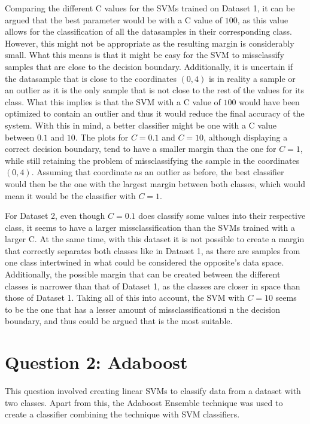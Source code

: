 \documentclass{article}
\begin{document}
Comparing the different C values for the SVMs trained on Dataset 1, it can be argued that the best parameter would be with a C value of $100$, as this value allows for the classification of all the datasamples in their corresponding class. However, this might not be appropriate as the resulting margin is considerably small. What this means is that it might be easy for the SVM to missclassify samples that are close to the decision boundary. Additionally, it is uncertain if the datasample that is close to the coordinates $(0,4)$ is in reality a sample or an outlier as it is the only sample that is not close to the rest of the values for its class. What this implies is that the SVM with a C value of $100$ would have been optimized to contain an outlier and thus it would reduce the final accuracy of the system. With this in mind, a better classifier might be one with a C value between $0.1$ and $10$. The plots for $C=0.1$ and $C=10$, although displaying a correct decision boundary, tend to have a smaller margin than the one for $C=1$, while still retaining the problem of missclassifying the sample in the coordinates $(0,4)$. Assuming that coordinate as an outlier as before, the best classifier would then be the one with the largest margin between both classes, which would mean it would be the classifier with $C=1$.

For Dataset 2, even though $C=0.1$ does classify some values into their respective class, it seems to have a larger missclassification than the SVMs trained with a larger C. At the same time, with this dataset it is not possible to create a margin that correctly separates both classes like in Dataset 1, as there are samples from one class intertwined in what could be considered the opposite's data space. Additionally, the possible margin that can be created between the different classes is narrower than that of Dataset 1, as the classes are closer in space than those of Dataset 1. Taking all of this into account, the SVM with $C=10$ seems to be the one that has a lesser amount of missclassificationsi n the decision boundary, and thus could be argued that is the most suitable.

\section{Question 2: Adaboost}
\label{sec:Q2}
This question involved creating linear SVMs to classify data from a dataset with two classes. Apart from this, the Adaboost Ensemble technique was used to create a classifier combining the technique with SVM classifiers.


\end{document}
